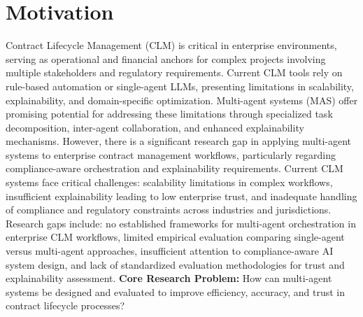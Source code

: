 
\section{Motivation}\label{section:motivation}

Contract Lifecycle Management (CLM) \cite{wikipedia2025contractlifecyclemanagement} is critical in enterprise environments, serving as operational and financial anchors for complex projects involving multiple stakeholders and regulatory requirements. Current CLM tools rely on rule-based automation or single-agent LLMs, presenting limitations in scalability, explainability, and domain-specific optimization.
\newline
\break
Multi-agent systems (MAS) offer promising potential for addressing these limitations through specialized task decomposition, inter-agent collaboration, and enhanced explainability mechanisms. However, there is a significant research gap in applying multi-agent systems to enterprise contract management workflows, particularly regarding compliance-aware orchestration and explainability requirements.
\newline
\break
Current CLM systems face critical challenges: scalability limitations in complex workflows, insufficient explainability leading to low enterprise trust, and inadequate handling of compliance and regulatory constraints across industries and jurisdictions.
\newline
\break
Research gaps include: no established frameworks for multi-agent orchestration in enterprise CLM workflows, limited empirical evaluation comparing single-agent versus multi-agent approaches, insufficient attention to compliance-aware AI system design, and lack of standardized evaluation methodologies for trust and explainability assessment.
\newline
\break
\textbf{Core Research Problem:} How can multi-agent systems be designed and evaluated to improve efficiency, accuracy, and trust in contract lifecycle processes?
\newline
\break
